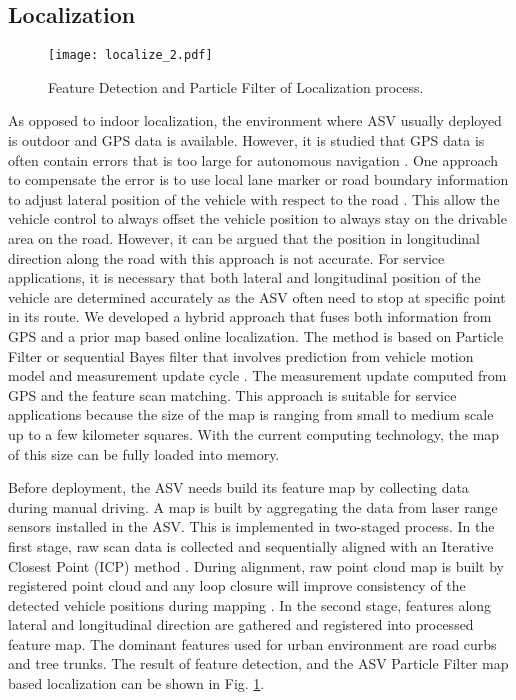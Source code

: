 \documentclass[10 pt,a4paper,conference]{IEEEtran}
\begin{document}
\subsection{Localization}\label{localization}

\begin{figure}[!t]
\centering
\texttt{[image: localize\_2.pdf]}
\caption{Feature Detection and Particle Filter of Localization process.}
\label{fig_localize}
\end{figure}

As opposed to indoor localization, the environment where ASV usually
deployed is outdoor and GPS data is available. However, it is studied
that GPS data is often contain errors that is too large for autonomous
navigation \citep{6629559}. One approach to compensate the error is to
use local lane marker or road boundary information to adjust lateral
position of the vehicle with respect to the road \citep{loc_Boss}. This
allow the vehicle control to always offset the vehicle position to
always stay on the drivable area on the road. However, it can be argued
that the position in longitudinal direction along the road with this
approach is not accurate. For service applications, it is necessary that
both lateral and longitudinal position of the vehicle are determined
accurately as the ASV often need to stop at specific point in its route.
We developed a hybrid approach that fuses both information from GPS and
a prior map based online localization. The method is based on Particle
Filter or sequential Bayes filter that involves prediction from vehicle
motion model and measurement update cycle \citep{6550131}. The
measurement update computed from GPS and the feature scan matching. This
approach is suitable for service applications because the size of the
map is ranging from small to medium scale up to a few kilometer squares.
With the current computing technology, the map of this size can be fully
loaded into memory.

Before deployment, the ASV needs build its feature map by collecting
data during manual driving. A map is built by aggregating the data from
laser range sensors installed in the ASV. This is implemented in
two-staged process. In the first stage, raw scan data is collected and
sequentially aligned with an Iterative Closest Point (ICP) method
\citep{censi08plicp}. During alignment, raw point cloud map is built by
registered point cloud and any loop closure will improve consistency of
the detected vehicle positions during mapping \citep{tiar2015fast}. In
the second stage, features along lateral and longitudinal direction are
gathered and registered into processed feature map. The dominant
features used for urban environment are road curbs and tree trunks. The
result of feature detection, and the ASV Particle Filter map based
localization can be shown in Fig. \ref{fig_localize}.
\end{document}

